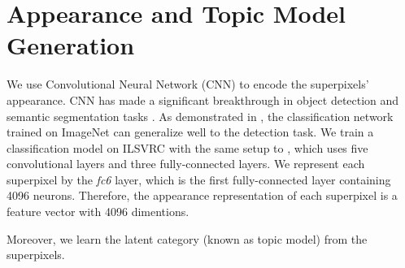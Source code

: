 \section{Appearance and Topic Model Generation}
\label{sec:appearancetopic}
We use Convolutional Neural Network (CNN) to encode the superpixels' appearance. CNN has made a significant breakthrough in object detection and semantic segmentation tasks \cite{girshick2013rich}. As demonstrated in \cite{girshick2013rich}, the classification network trained on ImageNet \cite{deng2009imagenet} can generalize well to the detection task. We train a classification model on ILSVRC with the same setup to \cite{girshick2013rich}, which uses five convolutional layers and three fully-connected layers. We represent each superpixel by the \textit{fc6} layer, which is the first fully-connected layer containing 4096 neurons. Therefore, the appearance representation of each superpixel is a feature vector with 4096 dimentions.

Moreover, we learn the latent category (known as topic model) from the superpixels. 



